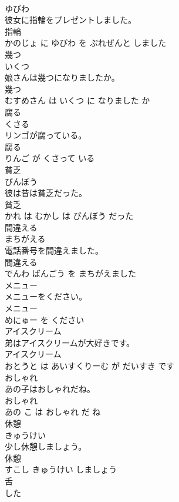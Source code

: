 \documentclass[8pt]{extreport}
\begin{document}
\begin{CJK}{UTF8}{min}
\\	ゆびわ			
\\	彼女に指輪をプレゼントしました。	
\\	指輪 
\\	かのじょ に ゆびわ を ぷれぜんと しました			
\\	幾つ	
\\	いくつ			
\\	娘さんは幾つになりましたか。	
\\	幾つ 
\\	むすめさん は いくつ に なりました か			
\\	腐る	
\\	くさる			
\\	リンゴが腐っている。	
\\	腐る 
\\	りんご が くさって いる			
\\	貧乏	
\\	びんぼう			
\\	彼は昔は貧乏だった。	
\\	貧乏 
\\	かれ は むかし は びんぼう だった			
\\	間違える	
\\	まちがえる			
\\	電話番号を間違えました。	
\\	間違える 
\\	でんわ ばんごう を まちがえました			
\\	メニュー	
\\	メニューをください。	
\\	メニュー 
\\	めにゅー を ください			
\\	アイスクリーム	
\\	弟はアイスクリームが大好きです。	
\\	アイスクリーム 
\\	おとうと は あいすくりーむ が だいすき です			
\\	おしゃれ	
\\	あの子はおしゃれだね。	
\\	おしゃれ 
\\	あの こ は おしゃれ だ ね			
\\	休憩	
\\	きゅうけい			
\\	少し休憩しましょう。	
\\	休憩 
\\	すこし きゅうけい しましょう			
\\	舌	
\\	した			

\end{CJK}
\end{document}
